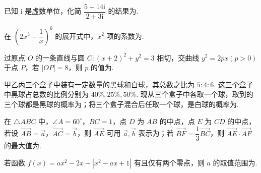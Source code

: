 \documentclass[a4paper,11pt]{report}
\begin{document}
\begin{examquestions}[start=10]

\item 已知 $\mathrm{i}$ 是虚数单位，化简 $\dfrac{5+14\mathrm{i}}{2+3\mathrm{i}}$ 的结果为\blank. 
\item 在 $\left(2x^3-\dfrac1x\right)^6$ 的展开式中，$x^2$ 项的系数为\blank. 
\item 过原点 $O$ 的一条直线与圆 $C:(x+2)^2+y^2=3$ 相切，交曲线 $y^2=2px(p>0)$ 于点 $P$，若 $|OP|=8$，则 $p$ 的值为\blank. 
\newpage
\item 甲乙丙三个盒子中装有一定数量的黑球和白球，其总数之比为 $5:4:6$. 这三个盒子中黑球占总数的比例分别为 $40\%,25\%,50\%$. 现从三个盒子中各取一个球，取到的三个球都是黑球的概率为\blank；将三个盒子混合后任取一个球，是白球的概率为\blank. 
\item 在 $\triangle ABC$ 中，$\angle A=60^\circ$，$BC=1$，点 $D$ 为 $AB$ 的中点，点 $E$ 为 $CD$ 的中点，若设 $\overrightarrow{AB}=\vec a$，$\overrightarrow{AC}=\vec b$，则 $\overrightarrow{AE}$ 可用 $\vec a,\vec b$ 表示为\blank；若 $\overrightarrow{BF}=\dfrac13\overrightarrow{BC}$，则 $\overrightarrow{AE}\cdot\overrightarrow{AF}$ 的最大值为\blank. 
\item 若函数 $f(x)=ax^2-2x-|x^2-ax+1|$ 有且仅有两个零点，则 $a$ 的取值范围为\blank. 

\end{examquestions}
\end{document}
